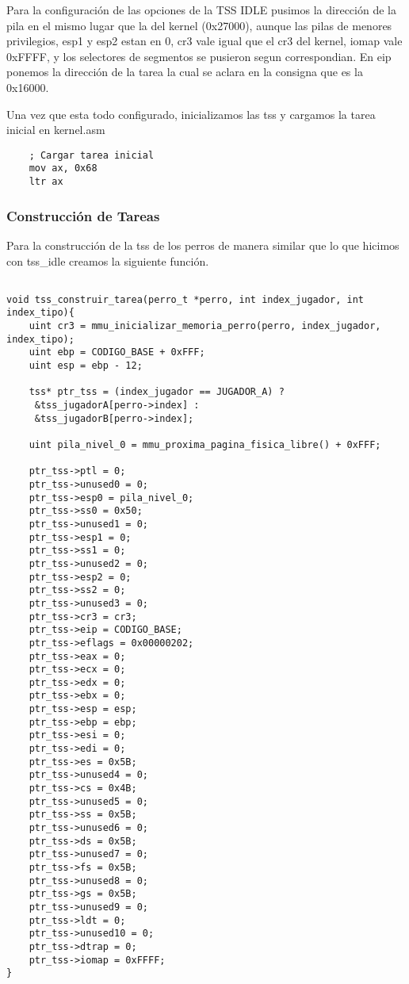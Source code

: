Para la configuración de las opciones de la TSS IDLE pusimos la dirección de la pila en el mismo lugar que la del kernel (0x27000), aunque las pilas de menores privilegios, esp1 y esp2 estan en 0, cr3 vale igual que el cr3 del kernel, iomap vale 0xFFFF, y los selectores de segmentos se pusieron segun correspondian. En eip ponemos la dirección de la tarea la cual se aclara en la consigna que es la 0x16000.

Una vez que esta todo configurado, inicializamos las tss y cargamos la tarea inicial en kernel.asm

\begin{lstlisting}
	; Cargar tarea inicial
	mov ax, 0x68
	ltr ax
\end{lstlisting}

\subsubsection{Construcción de Tareas}

Para la construcción de la tss de los perros de manera similar que lo que hicimos con tss\_idle creamos la siguiente función.

\begin{lstlisting}

void tss_construir_tarea(perro_t *perro, int index_jugador, int index_tipo){
	uint cr3 = mmu_inicializar_memoria_perro(perro, index_jugador, index_tipo);
	uint ebp = CODIGO_BASE + 0xFFF;
	uint esp = ebp - 12;

	tss* ptr_tss = (index_jugador == JUGADOR_A) ?
	 &tss_jugadorA[perro->index] : 
	 &tss_jugadorB[perro->index];

	uint pila_nivel_0 = mmu_proxima_pagina_fisica_libre() + 0xFFF;

	ptr_tss->ptl = 0;
	ptr_tss->unused0 = 0;
	ptr_tss->esp0 = pila_nivel_0;
	ptr_tss->ss0 = 0x50;
	ptr_tss->unused1 = 0;
	ptr_tss->esp1 = 0;
	ptr_tss->ss1 = 0;
	ptr_tss->unused2 = 0;
	ptr_tss->esp2 = 0;
	ptr_tss->ss2 = 0;
	ptr_tss->unused3 = 0;
	ptr_tss->cr3 = cr3;
	ptr_tss->eip = CODIGO_BASE;
	ptr_tss->eflags = 0x00000202;
	ptr_tss->eax = 0;
	ptr_tss->ecx = 0;
	ptr_tss->edx = 0;
	ptr_tss->ebx = 0;
	ptr_tss->esp = esp;
	ptr_tss->ebp = ebp;
	ptr_tss->esi = 0;
	ptr_tss->edi = 0;
	ptr_tss->es = 0x5B;
	ptr_tss->unused4 = 0;
	ptr_tss->cs = 0x4B;
	ptr_tss->unused5 = 0;
	ptr_tss->ss = 0x5B;
	ptr_tss->unused6 = 0;
	ptr_tss->ds = 0x5B;
	ptr_tss->unused7 = 0;
	ptr_tss->fs = 0x5B;
	ptr_tss->unused8 = 0;
	ptr_tss->gs = 0x5B;
	ptr_tss->unused9 = 0;
	ptr_tss->ldt = 0;
	ptr_tss->unused10 = 0;
	ptr_tss->dtrap = 0;
	ptr_tss->iomap = 0xFFFF;
}
\end{lstlisting}

